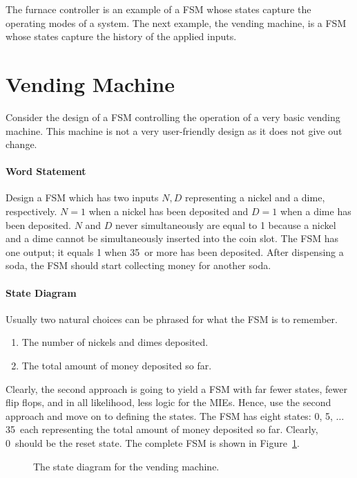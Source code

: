 The furnace controller is an example of a FSM whose states capture
the operating modes of a system.  The next example, the vending
machine, is a FSM whose states capture the history of the applied
inputs.


\section{Vending Machine}
Consider the design of a FSM controlling the operation of a
very basic vending machine.  This machine is not a very user-friendly design
as it does not give out change.

\paragraph{Word Statement}
Design a FSM which has two inputs $N, D$ representing a nickel and a dime,
respectively.  $N=1$ when a nickel has been deposited and $D=1$ 
when a dime has been deposited. $N$ and $D$ never simultaneously are  
equal to 1 because a nickel and a dime cannot be simultaneously 
inserted into the coin slot.  The FSM has one output; it equals 1 
when 35\textcent~or more has been deposited.  After dispensing a
soda, the FSM should start collecting money for another soda.

\paragraph{State Diagram}
Usually two natural choices can be phrased for what the 
FSM is to remember.
\begin{enumerate}
\item The number of nickels and dimes deposited.
\item The total amount of money deposited so far.
\end{enumerate}

Clearly, the second approach is going to yield a FSM with far fewer
states, fewer flip flops, and in all likelihood, less logic for the
MIEs.  Hence, use the second approach and move on to
defining the states.  The FSM has eight states:  
0\textcent, 5\textcent, $\ldots$ 35\textcent~each representing the total
amount of money deposited so far.  Clearly, 0\textcent~should be the 
reset state.  The complete FSM is shown in Figure~\ref{fig:vend}.

\begin{figure}[ht]

\caption{The state diagram for the vending machine.}
\label{fig:vend}

\end{figure}

